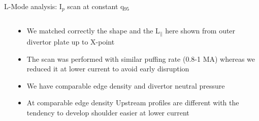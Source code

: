 \documentclass[10pt, compress]{beamer}
\newcommand\Fontvi{\fontsize{8}{7.2}\selectfont}
\begin{document}
\begin{frame}{L-Mode analysis: I$_p$ scan at constant q$_95$}
\Fontvi
  \vspace{-1cm}
\begin{columns}
  \begin{column}{0.65\textwidth}

  \end{column}
  \begin{column}{0.35\textwidth}
    \begin{itemize}
      \item<1|only@1> We matched correctly the shape and the L$_{\parallel}$
        here shown from outer divertor plate up to X-point 
      \item<2|only@2> The scan was performed with similar puffing rate (0.8-1
        MA) whereas we reduced it at lower current to avoid early disruption
      \item<2|only@2> We have comparable edge density and divertor neutral
        pressure 
      \item<3> At comparable edge density Upstream profiles are
        different with the tendency to develop shoulder easier at
        lower current
      \end{itemize}
    \end{column}
\end{columns}
\end{frame}


  
\end{document}
